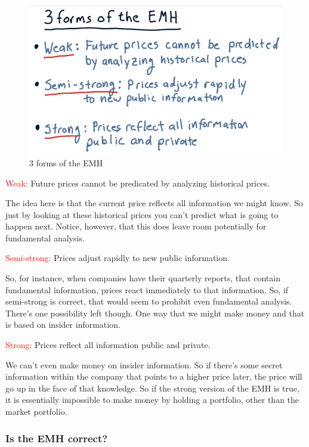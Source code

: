 \documentclass[12pt]{article}
\begin{document}
\begin{figure}[!ht]
\centering
\includegraphics[scale=0.4]{fig/fig58}
\caption{3 forms of the EMH}
\end{figure}

\noindent
\textcolor{red}{Weak:} Future prices cannot be predicated by analyzing historical prices. 

The idea here is that the current price reflects all information we might know. So just by looking at these historical prices you can't predict what is going to happen next. Notice, however, that this does leave room potentially for fundamental analysis. 

\noindent
\textcolor{red}{Semi-strong:} Prices adjust rapidly to new public information. 

So, for instance, when companies have their quarterly reports, that contain fundamental information, prices react immediately to that information. So, if semi-strong is correct, that would seem to prohibit even fundamental analysis. There's one possibility left though. One way that we might make money and that is based on insider information.

\noindent
\textcolor{red}{Strong:} Prices reflect all information public and private. 

We can't even make money on insider information. So if there's some secret information within the company that points to a higher price later, the price will go up in the face of that knowledge. So if the strong version of the EMH is true, it is essentially impossible to make money by holding a portfolio, other than the market portfolio. 

\subsubsection{Is the EMH correct?}
\end{document}

